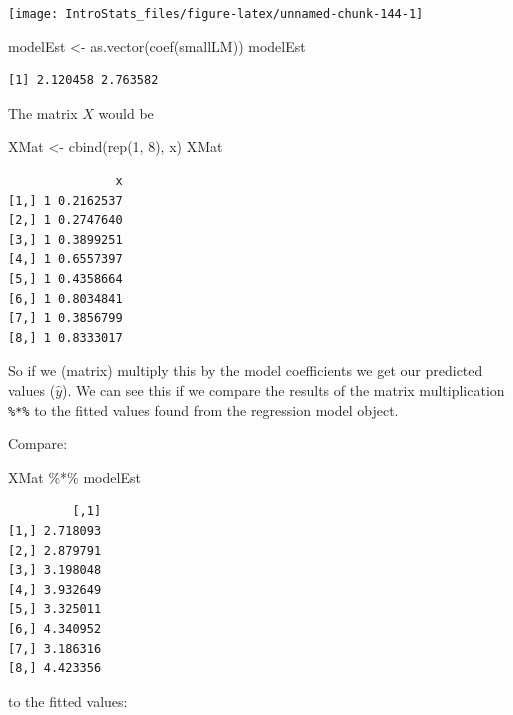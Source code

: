 \documentclass[
  oneside]{krantz}
\newenvironment{Shaded}{\begin{snugshade}}{\end{snugshade}}
\newcommand{\DecValTok}[1]{\textcolor[rgb]{0.00,0.00,0.81}{#1}}
\newcommand{\FunctionTok}[1]{\textcolor[rgb]{0.00,0.00,0.00}{#1}}
\newcommand{\NormalTok}[1]{#1}
\newcommand{\OtherTok}[1]{\textcolor[rgb]{0.56,0.35,0.01}{#1}}
\newcommand{\SpecialCharTok}[1]{\textcolor[rgb]{0.00,0.00,0.00}{#1}}
\begin{document}
\begin{center}\texttt{[image: IntroStats\_files/figure-latex/unnamed-chunk-144-1]} \end{center}

\begin{Shaded}
\begin{Highlighting}[]
\NormalTok{  modelEst }\OtherTok{\textless{}{-}} \FunctionTok{as.vector}\NormalTok{(}\FunctionTok{coef}\NormalTok{(smallLM))}
\NormalTok{  modelEst}
\end{Highlighting}
\end{Shaded}

\begin{verbatim}
[1] 2.120458 2.763582
\end{verbatim}

The matrix \emph{\(X\)} would be

\begin{Shaded}
\begin{Highlighting}[]
\NormalTok{XMat }\OtherTok{\textless{}{-}} \FunctionTok{cbind}\NormalTok{(}\FunctionTok{rep}\NormalTok{(}\DecValTok{1}\NormalTok{, }\DecValTok{8}\NormalTok{), x)}
\NormalTok{XMat}
\end{Highlighting}
\end{Shaded}

\begin{verbatim}
               x
[1,] 1 0.2162537
[2,] 1 0.2747640
[3,] 1 0.3899251
[4,] 1 0.6557397
[5,] 1 0.4358664
[6,] 1 0.8034841
[7,] 1 0.3856799
[8,] 1 0.8333017
\end{verbatim}

So if we (matrix) multiply this by the model coefficients we get our predicted values (\(\hat{y}\)). We can see this if we compare the results of the matrix multiplication \texttt{\%*\%} to the fitted values found from the regression model object.

Compare:

\begin{Shaded}
\begin{Highlighting}[]
\NormalTok{ XMat }\SpecialCharTok{\%*\%}\NormalTok{ modelEst}
\end{Highlighting}
\end{Shaded}

\begin{verbatim}
         [,1]
[1,] 2.718093
[2,] 2.879791
[3,] 3.198048
[4,] 3.932649
[5,] 3.325011
[6,] 4.340952
[7,] 3.186316
[8,] 4.423356
\end{verbatim}

to the fitted values:
\end{document}
